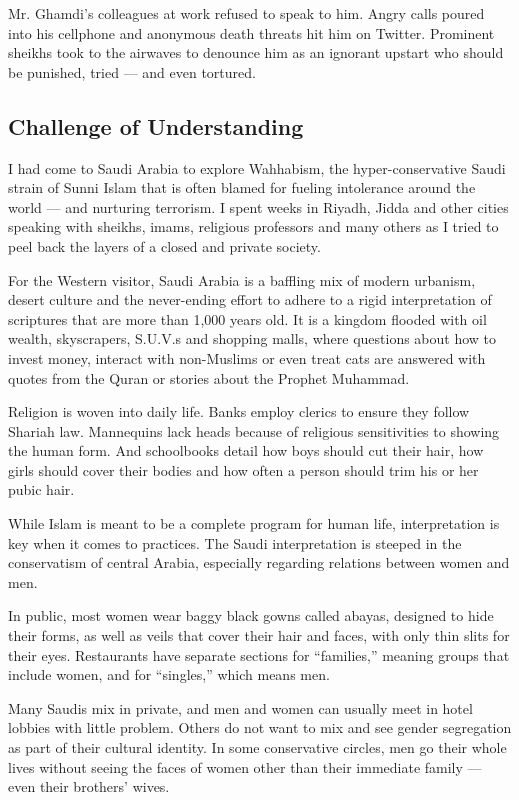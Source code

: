 Mr. Ghamdi's colleagues at work refused to speak to him. Angry calls
poured into his cellphone and anonymous death threats hit him on
Twitter. Prominent sheikhs took to the airwaves to denounce him as an
ignorant upstart who should be punished, tried --- and even tortured.

\hypertarget{challenge-of-understanding}{%
\subsection{Challenge of
Understanding}\label{challenge-of-understanding}}

I had come to Saudi Arabia to explore Wahhabism, the hyper-conservative
Saudi strain of Sunni Islam that is often blamed for fueling intolerance
around the world --- and nurturing terrorism. I spent weeks in Riyadh,
Jidda and other cities speaking with sheikhs, imams, religious
professors and many others as I tried to peel back the layers of a
closed and private society.

For the Western visitor, Saudi Arabia is a baffling mix of modern
urbanism, desert culture and the never-ending effort to adhere to a
rigid interpretation of scriptures that are more than 1,000 years old.
It is a kingdom flooded with oil wealth, skyscrapers, S.U.V.s and
shopping malls, where questions about how to invest money, interact with
non-Muslims or even treat cats are answered with quotes from the Quran
or stories about the Prophet Muhammad.

Religion is woven into daily life. Banks employ clerics to ensure they
follow Shariah law. Mannequins lack heads because of religious
sensitivities to showing the human form. And schoolbooks detail how boys
should cut their hair, how girls should cover their bodies and how often
a person should trim his or her pubic hair.

While Islam is meant to be a complete program for human life,
interpretation is key when it comes to practices. The Saudi
interpretation is steeped in the conservatism of central Arabia,
especially regarding relations between women and men.

In public, most women wear baggy black gowns called abayas, designed to
hide their forms, as well as veils that cover their hair and faces, with
only thin slits for their eyes. Restaurants have separate sections for
``families,'' meaning groups that include women, and for ``singles,''
which means men.

Many Saudis mix in private, and men and women can usually meet in hotel
lobbies with little problem. Others do not want to mix and see gender
segregation as part of their cultural identity. In some conservative
circles, men go their whole lives without seeing the faces of women
other than their immediate family --- even their brothers' wives.

